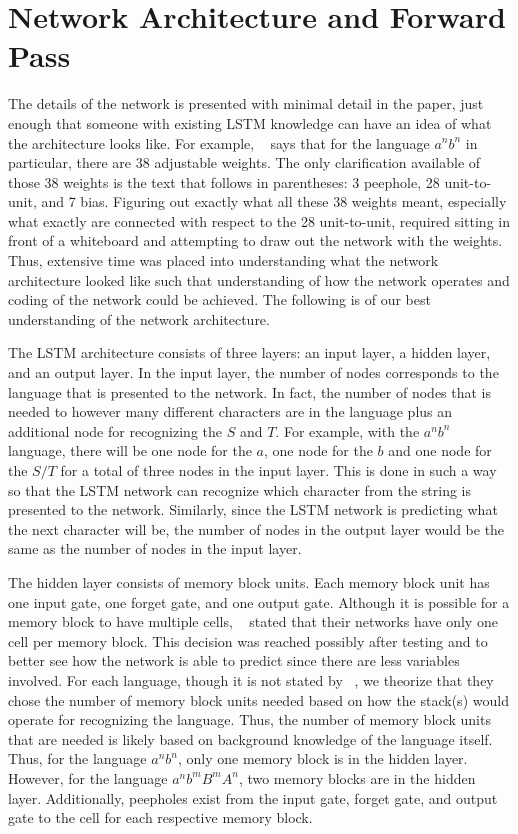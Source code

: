 \documentclass[11pt,letterpaper]{article}
\begin{document}
\section{Network Architecture and Forward Pass}
The details of the network is presented with minimal detail in the paper, just enough that someone with existing LSTM knowledge can have an idea of what the architecture looks like. For example, ~\cite{Gers:01} says that for the language $a^nb^n$ in particular, there are 38 adjustable weights. The only clarification available of those 38 weights is the text that follows in parentheses: 3 peephole, 28 unit-to-unit, and 7 bias. Figuring out exactly what all these 38 weights meant, especially what exactly are connected with respect to the 28 unit-to-unit, required sitting in front of a whiteboard and attempting to draw out the network with the weights.  Thus, extensive time was placed into understanding what the network architecture looked like such that understanding of how the network operates and coding of the network could be achieved. The following is of our best understanding of the network architecture.

The LSTM architecture consists of three layers: an input layer, a hidden layer, and an output layer. In the input layer, the number of nodes corresponds to the language that is presented to the network. In fact, the number of nodes that is needed to however many different characters are in the language plus an additional node for recognizing the $S$ and $T$. For example, with the $a^nb^n$ language, there will be one node for the $a$, one node for the $b$ and one node for the $S/T$ for a total of three nodes in the input layer. This is done in such a way so that the LSTM network can recognize which character from the string is presented to the network. Similarly, since the LSTM network is predicting what the next character will be, the number of nodes in the output layer would be the same as the number of nodes in the input layer.

The hidden layer consists of memory block units. Each memory block unit has one input gate, one forget gate, and one output gate. Although it is possible for a memory block to have multiple cells, ~\cite{Gers:01} stated that their networks have only one cell per memory block. This decision was reached possibly after testing and to better see how the network is able to predict since there are less variables involved. For each language, though it is not stated by ~\cite{Gers:01}, we theorize that they chose the number of memory block units needed based on how the stack(s) would operate for recognizing the language. Thus, the number of memory block units that are needed is likely based on background knowledge of the language itself. Thus, for the language $a^nb^n$, only one memory block is in the hidden layer. However, for the language $a^nb^mB^mA^n$, two memory blocks are in the hidden layer. Additionally, peepholes exist from the input gate, forget gate, and output gate to the cell for each respective memory block.
\end{document}

